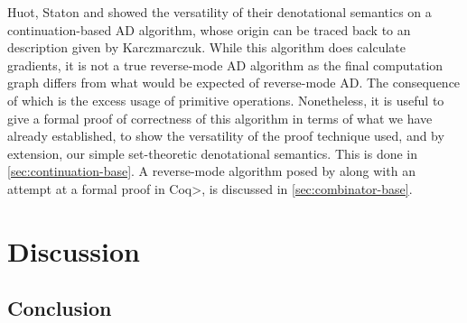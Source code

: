 \documentclass[11pt, final]{article}
\begin{document}
  Huot, Staton and \Vakar{} showed the versatility of their denotational semantics on a continuation-based AD algorithm, whose origin can be traced back to an description given by Karczmarczuk\cite{KarczmarczukLazyTimeReversal}.
  While this algorithm does calculate gradients, it is not a true reverse-mode AD algorithm as the final computation graph differs from what would be expected of reverse-mode AD\cite{PearlmutterSiskind2008}.
  The consequence of which is the excess usage of primitive operations.
  Nonetheless, it is useful to give a formal proof of correctness of this algorithm in terms of what we have already established, to show the versatility of the proof technique used, and by extension, our simple set-theoretic denotational semantics.
  This is done in \cref{sec:continuation-base}.
  A reverse-mode algorithm posed by \Vakar{}\cite{} along with an attempt at a formal proof in \<Coq>, is discussed in \cref{sec:combinator-base}.
  
  
\section{Discussion}
  
  \subsection{Conclusion}
\appendix
\printbibliography
\makeatother
\end{document}
